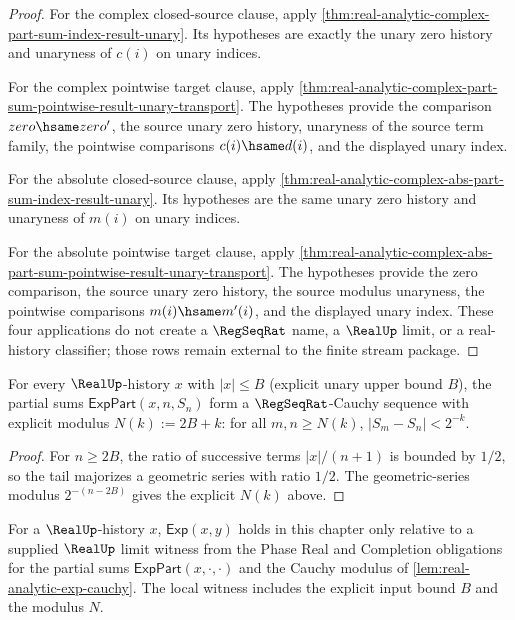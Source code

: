 \begin{proof}
For the complex closed-source clause, apply
\autoref{thm:real-analytic-complex-part-sum-index-result-unary}. Its hypotheses
are exactly the unary zero history and unaryness of $c(i)$ on unary indices.

For the complex pointwise target clause, apply
\autoref{thm:real-analytic-complex-part-sum-pointwise-result-unary-transport}.
The hypotheses provide the comparison $zero\hsame zero'$, the source unary
zero history, unaryness of the source term family, the pointwise comparisons
$c(i)\hsame d(i)$, and the displayed unary index.

For the absolute closed-source clause, apply
\autoref{thm:real-analytic-complex-abs-part-sum-index-result-unary}. Its
hypotheses are the same unary zero history and unaryness of $m(i)$ on unary
indices.

For the absolute pointwise target clause, apply
\autoref{thm:real-analytic-complex-abs-part-sum-pointwise-result-unary-transport}.
The hypotheses provide the zero comparison, the source unary zero history, the
source modulus unaryness, the pointwise comparisons $m(i)\hsame m'(i)$, and the
displayed unary index. These four applications do not create a
$\RegSeqRat$ name, a $\RealUp$ limit, or a real-history classifier; those rows
remain external to the finite stream package.
\end{proof}

\begin{lemma}
\label{lem:real-analytic-exp-cauchy}
For every \(\RealUp\)-history \(x\) with \(|x| \leq B\) (explicit unary upper bound \(B\)), the partial sums \(\mathsf{ExpPart}(x, n, S_n)\) form a \(\RegSeqRat\)-Cauchy sequence with explicit modulus \(N(k) := 2 B + k\): for all \(m, n \geq N(k)\), \(|S_m - S_n| < 2^{-k}\).
\end{lemma}
\begin{proof}
For \(n \geq 2B\), the ratio of successive terms \(|x|/(n+1)\) is bounded by \(1/2\), so the tail majorizes a geometric series with ratio \(1/2\). The geometric-series modulus \(2^{-(n - 2B)}\) gives the explicit \(N(k)\) above.
\end{proof}

\begin{definition}
\label{def:real-analytic-exp}
For a $\RealUp$-history $x$, $\mathsf{Exp}(x, y)$ holds in this chapter only relative to a supplied $\RealUp$ limit witness from the Phase Real and Completion obligations for the partial sums $\mathsf{ExpPart}(x, \cdot, \cdot)$ and the Cauchy modulus of \autoref{lem:real-analytic-exp-cauchy}. The local witness includes the explicit input bound $B$ and the modulus $N$.
\end{definition}

